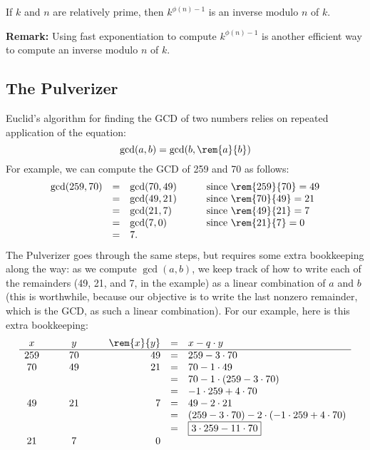 \documentclass[handout]{mcs}
\begin{document}
\begin{corollary*}
If $k$ and $n$ are relatively prime, then $k^{\phi(n)-1}$ is an inverse
modulo $n$ of $k$.
\end{corollary*}

\textbf{Remark:} Using fast exponentiation to compute $k^{\phi(n)-1}$ is
another efficient way to compute an inverse modulo $n$ of $k$.

\subsection*{The Pulverizer}

Euclid's algorithm for finding the GCD of two numbers relies on
repeated application of the equation: 
\[
\gcd(a, b) = \gcd(b, \rem{a}{b})
\]
For example, we can compute the GCD of 259 and 70 as follows:
\[
\begin{array}{rclcl}
\gcd(259, 70)
    & = & \gcd(70, 49) & \quad & \text{since $\rem{259}{70} = 49$}\\
    & = & \gcd(49, 21) && \text{since $\rem{70}{49} = 21$} \\
    & = & \gcd(21, 7) && \text{since $\rem{49}{21} = 7$} \\
    & = & \gcd(7, 0) && \text{since $\rem{21}{7} = 0$} \\
    & = & 7.
\end{array}
\]
The Pulverizer goes through the same steps, but requires some extra
bookkeeping along the way: as we compute $\gcd(a, b)$, we keep track
of how to write each of the remainders (49, 21, and 7, in the example)
as a linear combination of $a$ and $b$ (this is worthwhile, because
our objective is to write the last nonzero remainder, which is the
GCD, as such a linear combination).  For our example, here is this
extra bookkeeping:
\[
\begin{array}{ccccrcl}
x & \quad & y & \quad & \rem{x}{y} & = & x - q \cdot y \\ \hline
259 && 70 && 49 & = &   259 - 3 \cdot 70 \\
70 && 49 && 21  & = &   70 - 1 \cdot 49 \\
&&&&            & = &   70 - 1 \cdot (259 - 3 \cdot 70) \\
&&&&            & = &   -1 \cdot 259 + 4 \cdot 70 \\
49 && 21 && 7   & = &   49 - 2 \cdot 21 \\
&&&&            & = &   (259 - 3 \cdot 70) -
                                2 \cdot (-1 \cdot 259 + 4 \cdot 70) \\
&&&&            & = &   \fbox{$3 \cdot 259 - 11 \cdot 70$} \\
21 && 7 && 0
\end{array}
\]
\end{document}
